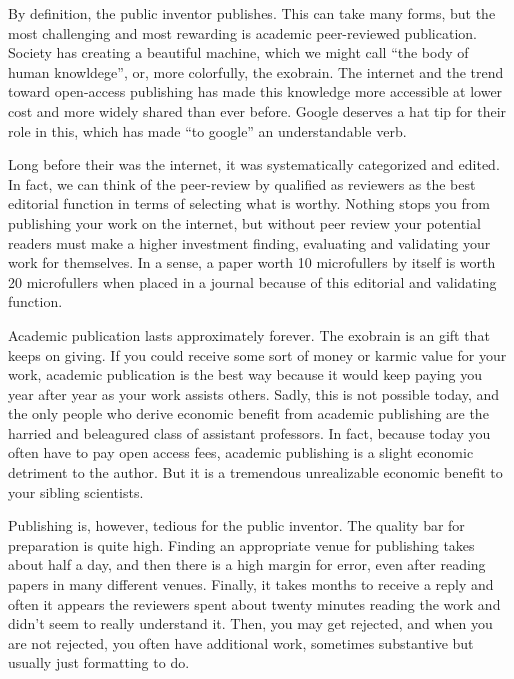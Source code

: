 \documentclass[
	fontsize=10pt, %
	twoside=false, %
	secnumdepth=1, %
]{kaobook}
\begin{document}
By definition, the public inventor publishes.
This can take many forms, but the most challenging and most rewarding
is academic peer-reviewed publication.
Society has creating a beautiful machine, which we might
call ``the body of human knowldege'', or, more colorfully, the exobrain.
The internet and the trend toward open-access publishing has made this
knowledge more accessible at lower cost and more widely shared
than ever before.
Google deserves a hat tip for their role in this, which has made
``to google'' an understandable verb.

Long before their was the internet, it was systematically categorized
and edited. In fact, we can think of the peer-review by qualified as
reviewers as the best editorial function in terms of selecting what
is worthy.
Nothing stops you from publishing your work on the internet, but
without peer review your potential readers must make a higher investment
finding, evaluating and validating your work for themselves.
In a sense, a paper worth 10 microfullers by itself is worth
20 microfullers when placed in a journal because of this
editorial and validating function.

Academic publication lasts approximately forever.
The exobrain is an gift that keeps on giving.
If you could receive some sort of money or karmic value
for your work, academic publication is the best way
because it would keep paying you year after year as
your work assists others. Sadly, this is not possible
today, and the only people who derive economic benefit
from academic publishing are the harried and beleagured class of assistant professors.
In fact, because today you often have to pay open access fees, academic
publishing is a slight economic detriment to the author.
But it is a tremendous unrealizable economic benefit to your
sibling scientists.

Publishing is, however, tedious for the public inventor.
The quality bar for preparation is quite high.
Finding an appropriate venue for publishing takes about half a day, and
then there is a high margin for error, even after reading papers in many
different venues.
Finally, it takes months to receive a reply and often it appears
the reviewers spent about twenty minutes reading the work and didn't seem
to really understand it.
Then, you may get rejected, and when you are not rejected, you often
have additional work, sometimes substantive but usually just formatting to do.
\end{document}
